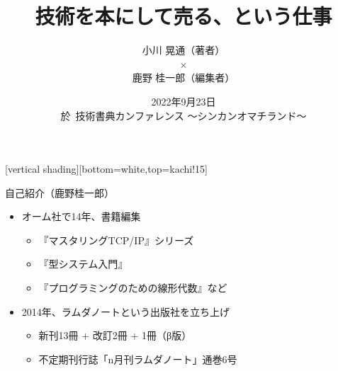 \documentclass[13pt,dvipdfmx,uplatex]{beamer}
\title{技術を本にして売る、という仕事}
\author{\sffamily 小川 晃通（著者） \\
$\times$ \\
鹿野 桂一郎（編集者）}
\date{\sffamily\footnotesize 2022年9月23日\\ 於\, 技術書典カンファレンス ～シンカンオマチランド～}
\def\tightlist{\sffamily}
\begin{document}
\selectfont

\frame{\titlepage}

[vertical shading][bottom=white,top=kachi!15]


\begin{frame}{自己紹介（鹿野桂一郎）}
\protect\hypertarget{ux81eaux5df1ux7d39ux4ecbux9e7fux91ceux6842ux4e00ux90ce}{}
\begin{itemize}
\tightlist
\item
  オーム社で14年、書籍編集

  \begin{itemize}
  \tightlist
  \item
    『マスタリングTCP/IP』シリーズ
  \item
    『型システム入門』
  \item
    『プログラミングのための線形代数』など
  \end{itemize}
\item
  2014年、ラムダノートという出版社を立ち上げ

  \begin{itemize}
  \tightlist
  \item
    新刊13冊 + 改訂2冊 + 1冊（β版）
  \item
    不定期刊行誌「n月刊ラムダノート」通巻6号
  \end{itemize}
\end{itemize}
\end{frame}
\end{document}

